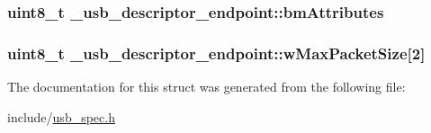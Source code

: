 \hypertarget{struct__usb__descriptor__endpoint_a6042f7ae567104f4a0ecc2a173b70b75}{
\subsubsection[{bm\-Attributes}]{\setlength{\rightskip}{0pt plus 5cm}uint8\-\_\-t \-\_\-usb\-\_\-descriptor\-\_\-endpoint\-::bm\-Attributes}}\label{struct__usb__descriptor__endpoint_a6042f7ae567104f4a0ecc2a173b70b75}
\hypertarget{struct__usb__descriptor__endpoint_a4d4bc99844ec977a7285551bed4d541e}{
\subsubsection[{w\-Max\-Packet\-Size}]{\setlength{\rightskip}{0pt plus 5cm}uint8\-\_\-t \-\_\-usb\-\_\-descriptor\-\_\-endpoint\-::w\-Max\-Packet\-Size\mbox{[}2\mbox{]}}}\label{struct__usb__descriptor__endpoint_a4d4bc99844ec977a7285551bed4d541e}


The documentation for this struct was generated from the following file\-:\begin{DoxyCompactItemize}
\item 
include/\hyperlink{usb__spec_8h}{usb\-\_\-spec.\-h}\end{DoxyCompactItemize}
